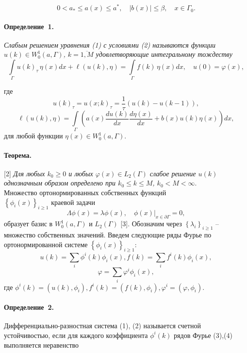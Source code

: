 \begin{equation*}{0<{{a}_{*}}\leqslant a(x)\leqslant{{a}^{*}},\quad|b(x)|\leqslant \beta,\quad x\in {{\Gamma }_{0}}.}\end{equation*} 

\paragraph{Определение~1.}  {\it Слабым решением   уравнения (1) с условиями (2) называются функции $ u(k)\in W_{0}^{1}(a,\Gamma ) $, $ k=\overline{1, M} $ удовлетворяющие интегральному тождеству} 
$$
	\int\limits_{\Gamma}u(k)_{\tau}\,\eta(x)dx+\ell(u(k),\eta)=
	\int\limits_{\Gamma}f(k)\,\eta(x) dx
	,\quad u(0)=\varphi(x) ,$$

 
где $$ u(k)_{\tau}=u(x;k)_{\tau}=\frac{1}{\tau}(u(k)-u(k-1)),$$
$$\ell(u(k),\eta)=\int\limits_{\Gamma}\left(a(x)\frac{d u(k)}{d x}\frac{d \eta(x)}{d x}+b(x)u(k)\eta(x)\right)dx,
$$
для любой функции $ \eta (x)\in W_{0}^{1}(a,\Gamma ) $.
\paragraph{Теорема.}[2] {\it Для любых $k_0\geqslant0$ и любых $\varphi(x)\in L_2(\Gamma)$ слабое решение $u(k)$ однозначным образом определено при $k_0\leqslant k\leqslant M$, $k_0<M<\infty$}.
\\

Множество ортонормированных собственных функций \\$\left\lbrace {\phi }_{i}(x) \right\rbrace_{i \geqslant 1}$ краевой задачи  $$\Lambda \phi(x) =\lambda \phi(x),\quad \phi(x){{|}_{x\in \partial \Gamma }}=0,$$ образует базис в $W_{0}^{1}(a,\Gamma )$ и ${{L}_{2}}(\Gamma )$  [3]. Обозначим через $\left\lbrace \lambda_{i}\right\rbrace_{i \geqslant 1}$ -- множество собственных значений.
 Введем следующие ряды Фурье по ортонормированной системе  $\left\{\phi_{i}(x)\right\}_{i \geqslant 1}$:
\begin{equation}{
u(k)=\sum_{i}\phi^{i}(k) \phi_{i}(x), f(k)=\sum_{i} f^{i}(k) \phi_{i}(x)},\end{equation} 
\begin{equation}{
\varphi=\sum_{i} \varphi^{i} \phi_{i}(x),
}
\end{equation} 
где $\phi^{i}(k)=\left(u(k), \phi_{i}\right), f^{i}(k)=\left(f(k), \phi_{i}\right), \varphi^{i}=\left(\varphi, \phi_{i}\right)$.

\paragraph{Определение~2.}Дифференциально-разностная система (1), (2) называется счетной устойчивостью, если для каждого коэффициента $\phi^{i}(k) $ рядов Фурье (3),(4) выполняется неравенство

